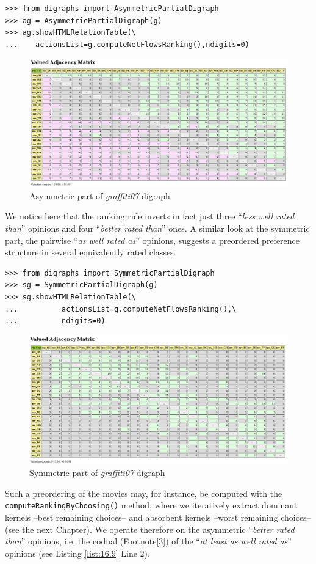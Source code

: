 \begin{lstlisting}
>>> from digraphs import AsymmetricPartialDigraph
>>> ag = AsymmetricPartialDigraph(g)
>>> ag.showHTMLRelationTable(\
...    actionsList=g.computeNetFlowsRanking(),ndigits=0)
\end{lstlisting}
\begin{figure}[h]
\includegraphics[width=12cm]{Figures/asymmetricPart.png}
\caption{Asymmetric part of \emph{graffiti07} digraph}
\label{fig:16.8}       %
\end{figure}
We notice here that the \NetFlows ranking rule inverts in fact just three ``\emph{less well rated than}'' opinions and four ``\emph{better rated than}'' ones. A similar look at the symmetric part, the pairwise ``\emph{as well rated as}'' opinions, suggests a preordered preference structure in several equivalently rated classes.

\begin{lstlisting}
>>> from digraphs import SymmetricPartialDigraph
>>> sg = SymmetricPartialDigraph(g)
>>> sg.showHTMLRelationTable(\
...          actionsList=g.computeNetFlowsRanking(),\
...          ndigits=0)
\end{lstlisting}
\begin{figure}[h]
\includegraphics[width=12cm]{Figures/symmetricPart.png}
\caption{Symmetric part of \emph{graffiti07} digraph}
\label{fig:16.9}       %
\end{figure}
Such a preordering of the movies may, for instance, be computed with the \texttt{computeRankingByChoosing()} method, where we iteratively extract dominant kernels --best remaining choices-- and absorbent kernels --worst remaining choices-- (see the next Chapter). We operate therefore on the asymmetric ``\emph{better rated than}'' opinions, i.e. the codual (Footnote[3]) of the ``\emph{at least as well rated as}'' opinions (see Listing \ref{list:16.9} Line 2).

